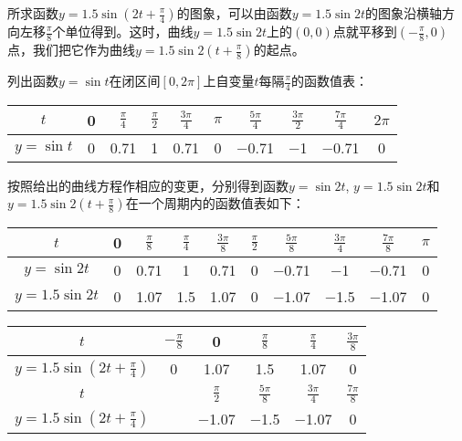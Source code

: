 \begin{solution}
所求函数$y=1.5\sin \left(2t+\frac{\pi}{4}\right)$的图象，可以由函数$y=1.5\sin 2t$的图象沿横轴方向左移$\frac{\pi}{8}$个单位得到。这时，曲线$y=1.5\sin2t$上的$(0, 0)$点就平移到$\left(-\frac{\pi}{8},0\right)$
点，我们把它作为曲线$y=1.5\sin2 \left(t+\frac{\pi}{8}\right)$的起点。

列出函数$y=\sin t$在闭区间$[0, 2\pi]$上自变量$t$每隔$\frac{\pi}{4}$的函数值表：
\begin{center}
\begin{tabular}{c|ccccccccc}
    \hline
$t$  &  0  &  $\frac{\pi}{4}$ & $\frac{\pi}{2}$   & $\frac{3\pi}{4}$  & $\pi$   & $\frac{5\pi}{4}$  & $\frac{3\pi}{2}$   & $\frac{7\pi}{4}$ &$2\pi$ \\ 
    \hline
$y=\sin t$  & 0   &   0.71 &  1 & 0.71   & 0  & $-$0.71   &  $-$1 & $-$0.71   & 0\\
    \hline
\end{tabular}
\end{center}

按照给出的曲线方程作相应的变更，分别得到函数$y=\sin2t$, $y=1.5\sin2t$和$y=1.5\sin2\left(t+\frac{\pi}{8}\right)$在一个周期内的函数值表如下：
\begin{center}
\begin{tabular}{c|ccccccccc}
    \hline
$t$  &  0  &  $\frac{\pi}{8}$ & $\frac{\pi}{4}$   & $\frac{3\pi}{8}$  & $\frac{\pi}{2}$   & $\frac{5\pi}{8}$  & $\frac{3\pi}{4}$   & $\frac{7\pi}{8}$ &$\pi$ \\ 
    \hline
$y=\sin 2t$  & 0   &   0.71 &  1 & 0.71   & 0  & $-$0.71   &  $-$1 & $-$0.71   & 0\\
$y=1.5\sin 2t$ & 0   &   1.07 &  1.5 & 1.07   & 0  & $-$1.07   &  $-$1.5 & $-$1.07   & 0\\
    \hline
\end{tabular}
\end{center}

\begin{center}
\begin{tabular}{c|ccccc}
    \hline
$t$  &  $-\frac{\pi}{8}$ & 0 & $\frac{\pi}{8}$   & $\frac{\pi}{4}$  & $\frac{3\pi}{8}$   \\     \hline
$y=1.5\sin \left(2t+\frac{\pi}{4}\right)$  & 0   &   1.07 &  1.5 & 1.07   & 0 \\
    \hline
    $t$  && $\frac{\pi}{2}$  & $\frac{5\pi}{8}$   & $\frac{3\pi}{4}$ &$\frac{7\pi}{8}$ \\
    \hline
    $y=1.5\sin \left(2t+\frac{\pi}{4}\right)$  &  & $-$1.07   &  $-$1.5 & $-$1.07   & 0\\
    \hline
\end{tabular}
\end{center}


\end{solution}
